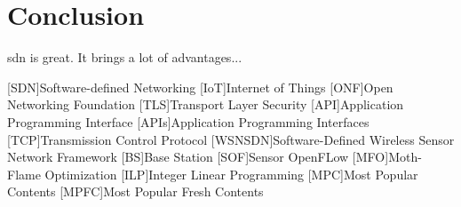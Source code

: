 \documentclass[conference]{IEEEtran}
\begin{document}
	\section{Conclusion}
	\label{section:conclusion}

	\ac{sdn} is great. It brings a lot of advantages...

	\printbibliography
	\begin{acronym}
		[SDN]{Software-defined Networking}
		[IoT]{Internet of Things}
		[ONF]{Open Networking Foundation}
		[TLS]{Transport Layer Security}
		[API]{Application Programming Interface}
		{Application Programming Interfaces}
		[TCP]{Transmission Control Protocol}
		[WSNSDN]{Software-Defined Wireless Sensor Network Framework }
		[BS]{Base Station}
		[SOF]{Sensor OpenFLow}
		[MFO]{Moth-Flame Optimization}
		[ILP]{Integer Linear Programming}
		[MPC]{Most Popular Contents}
		{Most Popular Fresh Contents}
	\end{acronym}

\end{document}
